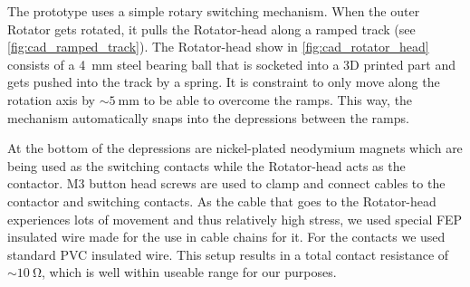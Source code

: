 \def\rotator{\textsf{Rotator}\xspace}
\def\rotatorhead{\textsf{Rotator-head}\xspace}

The prototype uses a simple rotary switching mechanism.
When the outer \rotator gets rotated, it pulls the \rotatorhead along a ramped track (see \autoref{fig:cad_ramped_track}).
The \rotatorhead show in \autoref{fig:cad_rotator_head} consists of a \SI{4}{mm} steel bearing ball that is socketed into a 3D printed part and gets pushed into the track by a spring.
It is constraint to only move along the rotation axis by $\sim\SI{5}{\mm}$ to be able to overcome the ramps.
This way, the mechanism automatically snaps into the depressions between the ramps.

At the bottom of the depressions are nickel-plated neodymium magnets which are being used as the switching contacts while the \rotatorhead acts as the contactor.
M3 button head screws are used to clamp and connect cables to the contactor and switching contacts.
As the cable that goes to the \rotatorhead experiences lots of movement and thus relatively high stress, we used special FEP insulated wire made for the use in cable chains for it.
For the contacts we used standard PVC insulated wire.
This setup results in a total contact resistance of $\sim\SI{10}{\ohm}$, which is well within useable range for our purposes.

